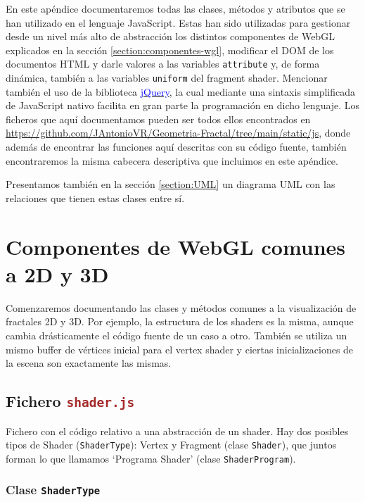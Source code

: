 En este apéndice documentaremos todas las clases, métodos y atributos que se han utilizado en el lenguaje JavaScript. Estas han sido utilizadas para gestionar desde un nivel más alto de abstracción los distintos componentes de WebGL explicados en la sección \ref{section:componentes-wgl}, modificar el DOM de los documentos HTML y darle valores a las variables \verb|attribute| y, de forma dinámica, también a las variables \verb|uniform| del fragment shader. Mencionar también el uso de la biblioteca \href{https://jquery.com/}{\textcolor{blue}{jQuery}}, la cual mediante una sintaxis simplificada de JavaScript nativo facilita en gran parte la programación en dicho lenguaje. Los ficheros que aquí documentamos pueden ser todos ellos encontrados en \url{https://github.com/JAntonioVR/Geometria-Fractal/tree/main/static/js}, donde además de encontrar las funciones aquí descritas con su código fuente, también encontraremos la misma cabecera descriptiva que incluimos en este apéndice.

Presentamos también en la sección \ref{section:UML} un diagrama UML con las relaciones que tienen estas clases entre sí.

\section{Componentes de WebGL comunes a 2D y 3D}

Comenzaremos documentando las clases y métodos comunes a la visualización de fractales 2D y 3D. Por ejemplo, la estructura de los shaders es la misma, aunque cambia drásticamente el código fuente de un caso a otro. También se utiliza un mismo buffer de vértices inicial para el vertex shader y ciertas inicializaciones de la escena son exactamente las mismas.

\subsection{Fichero \Large\texttt{\textcolor{brown}{shader.js}}}

Fichero con el código relativo a una abstracción de un shader. Hay dos posibles tipos de Shader (\verb|ShaderType|): Vertex y Fragment (clase \verb|Shader|), que juntos forman lo que llamamos `Programa Shader' (clase \verb|ShaderProgram|).

\subsubsection{Clase \Large\texttt{\textcolor{Bittersweet}{ShaderType}}}

